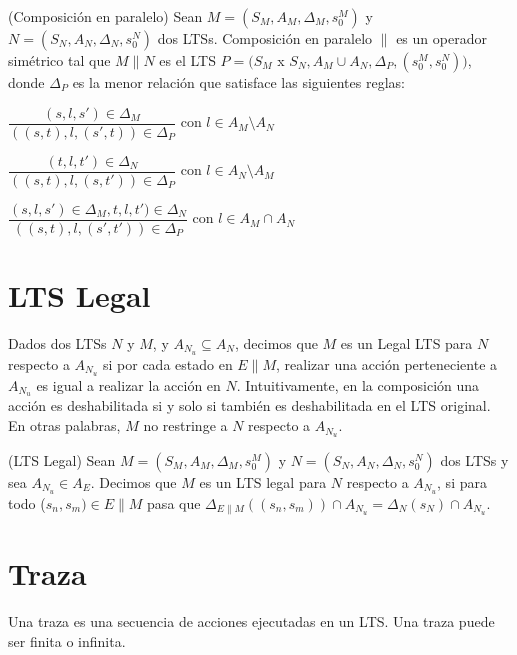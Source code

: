 \begin{definition}{(Composición en paralelo)}
Sean $M = (S_{M}, A_{M}, \Delta_{M}, s_{0}^{M})$ y\\
$N = (S_{N}, A_{N}, \Delta_{N}, s_{0}^{N})$ dos LTSs. Composición en paralelo $\parallel$ es un operador simétrico tal que 
$M \parallel N$ es el LTS $P = (S_{M}$ x $S_{N}, A_{M} \cup A_{N}, \Delta_{P}, (s_{0}^{M}, s_{0}^{N}))$, donde $\Delta_{P}$ es
la menor relación que satisface las siguientes reglas:

\vspace{\baselineskip}
$\dfrac{(s, l, s') \in \Delta_{M}}{((s, t), l, (s', t)) \in \Delta_{P}}$ con $l \in A_{M} \setminus A_{N}$

\vspace{\baselineskip}
$\dfrac{(t, l, t') \in \Delta_{N}}{((s, t), l, (s, t')) \in \Delta_{P}}$ con $l \in A_{N} \setminus A_{M}$

\vspace{\baselineskip}
$\dfrac{(s, l, s') \in \Delta_{M}, t, l, t') \in \Delta_{N}}{((s, t), l, (s', t')) \in \Delta_{P}}$ con $l \in A_{M} \cap A_{N}$
\end{definition}

\section{LTS Legal}
Dados dos LTSs $N$ y $M$, y $A_{N_{u}} \subseteq A_{N}$, decimos que $M$ es un Legal LTS para $N$ respecto a $A_{N_{u}}$ si por cada
estado en $E\parallel$$M$, realizar una acción perteneciente a $A_{N_{u}}$ es igual a realizar la acción en $N$.
Intuitivamente, en la composición una acción es deshabilitada si y solo si también es deshabilitada en el LTS original.
En otras palabras, $M$ no restringe a $N$ respecto a $A_{N_{u}}$.

\begin{definition}{(LTS Legal)}
Sean $M = (S_{M}, A_{M}, \Delta_{M}, s_{0}^{M})$ y $N = (S_{N}, A_{N}, \Delta_{N}, s_{0}^{N})$ dos LTSs y sea $A_{N_{u}} \in A_{E}$.
Decimos que $M$ es un LTS legal para $N$ respecto a $A_{N_{u}}$, si para todo ($s_{n}, s_{m}) \in E \parallel M$ pasa que 
$\Delta_{E \parallel M}((s_{n}, s_{m})) \cap A_{N_{u}} = \Delta_{N}(s_{N}) \cap A_{N_{u}}$.
\end{definition}

\section{Traza}
Una traza es una secuencia de acciones ejecutadas en un LTS. Una traza puede ser finita o infinita.

